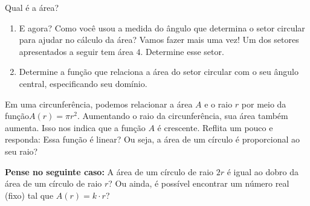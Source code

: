 \begin{task}{Qual é a área?}
\begin{enumerate}
\item{}
E agora? Como você usou a medida do ângulo que determina o setor circular para ajudar no cálculo da área? Vamos fazer mais uma vez! Um dos setores apresentados a seguir tem área \(4\). Determine esse setor.

\begin{figure}[H]
\centering


 \quad\quad\quad
      \quad\quad\quad
\end{figure}

\item{}
Determine a função que relaciona a área do setor circular com o seu ângulo central, especificando seu domínio.

\end{enumerate}
\end{task}

\begin{reflection}

Em uma circunferência, podemos relacionar a área \(A\) e o raio \(r\) por meio da função\linebreak \(A(r)=\pi r^2\). Aumentando o raio da circunferência, sua área também aumenta. Isso nos indica que a função \(A\) é crescente. Reflita um pouco e responda: Essa função é linear? Ou seja, a área de um círculo é proporcional ao seu raio?

\textbf{Pense no seguinte caso:} A área de um círculo de raio \(2r\) é igual ao dobro da área de um círculo de raio \(r\)? Ou ainda, é possível encontrar um número real (fixo) tal que \(A(r)=k\cdot r\)?


\begin{figure}[H]
\centering


\end{figure}
\end{reflection}


